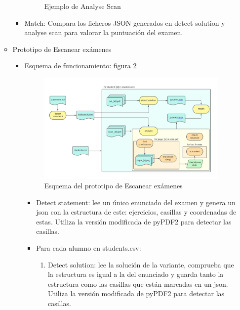 \begin{itemize}
\begin{itemize}
\begin{itemize}
\begin{figure}
                    \caption{Ejemplo de Analyse Scan}
                    \label{fig:exAnalyseScan}
                \end{figure}
                \item Match: Compara los ficheros JSON generados en detect solution y analyse scan para valorar la puntuación del examen. 
        \end{itemize}
        \item Prototipo de Escanear exámenes
        \begin{itemize}
            \item Esquema de funcionamiento: figura \ref{fig:protEscExam}
                \begin{figure}
                    \centering
                    \includegraphics[width=\textwidth]{figures/esquema_prototipo.png}
                    \caption{Esquema del prototipo de Escanear exámenes}
                    \label{fig:protEscExam}
                \end{figure}
                \begin{itemize}
                    \item Detect statement: lee un único enunciado del examen y genera un json con la estructura de este: ejercicios, casillas y coordenadas de estas. Utiliza la versión modificada de pyPDF2 para detectar las casillas.
                    \item Para cada alumno en students.csv:
                    \begin{enumerate}
                        \item Detect solution: lee la solución de la variante, comprueba que la estructura es igual a la del enunciado y guarda tanto la estructura como las casillas que están marcadas en un json. Utiliza la versión modificada de pyPDF2 para detectar las casillas.

\end{enumerate}
\end{itemize}
\end{itemize}
\end{itemize}
\end{itemize}
